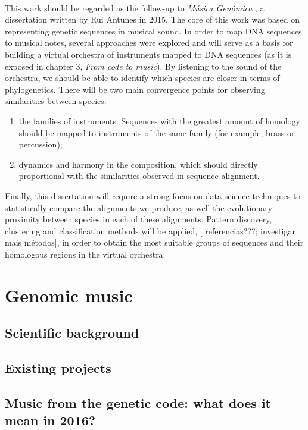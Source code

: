 \documentclass[11pt,twoside,a4paper]{report}
\begin{document}
\paragraph{} This work should be regarded as the follow-up to \textit{M\'usica Gen\'omica} \cite{rui_genomic}, a dissertation written by Rui Antunes in 2015. The core of this work was based on representing genetic sequences in musical sound. In order to map DNA sequences to musical notes, several approaches were explored and will serve as a basis for building a virtual orchestra of instruments mapped to DNA sequences (as it is exposed in chapter 3, \textit{From code to music}). By listening to the sound of the orchestra, we should be able to identify which species are closer in terms of phylogenetics. There will be two main convergence points for observing similarities between species: 
\begin{enumerate}
\item the families of instruments. Sequences with the greatest amount of homology should be mapped to instruments of the same family (for example, brass or percussion);
\item dynamics and harmony in the composition, which should directly proportional with the similarities observed in sequence alignment. 
\end{enumerate}
Finally, this dissertation will require a strong focus on data science techniques to statistically compare the alignments we produce, as well the evolutionary proximity between species in each of these alignments. Pattern discovery, clustering and classification  methods will be applied, [{\color{red} referencias???; investigar mais métodos}], in order to obtain the most suitable groups of sequences and their homologous regions in the virtual orchestra. 

\section{Genomic music}
\subsection{Scientific background}
\subsection{Existing projects}
\subsection{Music from the genetic code: what does it mean in 2016?}
\end{document}
